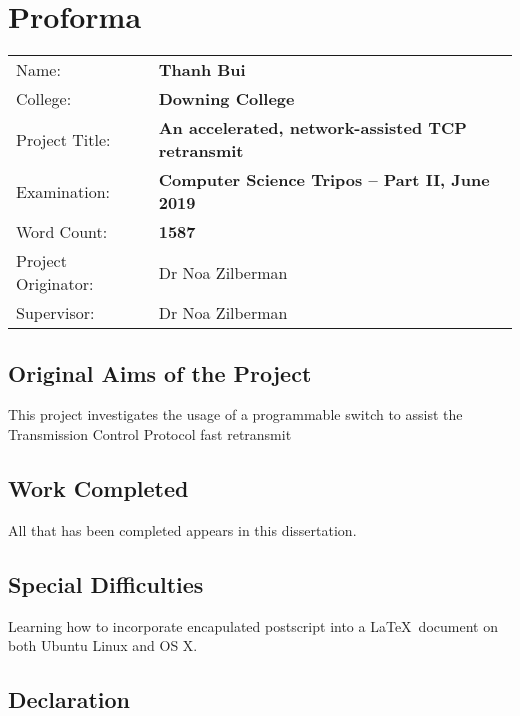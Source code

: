 \chapter*{Proforma}

{\large
\begin{tabular}{ l p{13cm}}
	Name:               & \bf Thanh Bui                      									  \\
	College:            & \bf Downing College                    							  \\
	Project Title:      & \bf An accelerated, network-assisted TCP retransmit \\
	Examination:        & \bf Computer Science Tripos -- Part II, June 2019  \\
	Word Count:         & \bf 1587\footnotemark[1]	 \\
	Project Originator: & Dr Noa Zilberman               \\
	Supervisor:         & Dr Noa Zilberman             		\\ 
\end{tabular}
}

\section*{Original Aims of the Project}

This project investigates the usage of a programmable switch to assist the Transmission Control Protocol fast retransmit

\section*{Work Completed}

All that has been completed appears in this dissertation.

\section*{Special Difficulties}

Learning how to incorporate encapulated postscript into a \LaTeX\
document on both Ubuntu Linux and OS X.

\newpage
\section*{Declaration}

